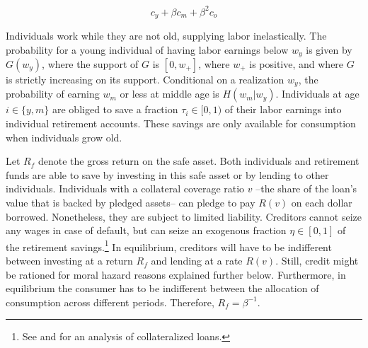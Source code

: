 \documentclass[draft,pdftex,nolinenumbers,noinfoline]{article}
\theoremstyle{plain}
\begin{document}
$$c_y + \beta c_m + \beta^{2}c_o$$ 

Individuals work while they are not old, supplying labor inelastically. The probability for a young individual of having labor earnings below $w_y$ is given by $G(w_y)$, where the support of $G$ is $[0,w_+]$, where $w_+$ is positive, and where $G$ is strictly increasing on its support. Conditional on a realization $w_y$, the probability of earning $w_m$ or less at middle age is $H(w_m|w_y)$. Individuals at age $i\in\{y,m\}$ are obliged to save a fraction $\tau_i\in[0,1)$ of their labor earnings into individual retirement accounts. These savings are only available for consumption when individuals grow old.

Let $R_f$ denote the gross return on the safe asset. Both individuals and retirement funds are able to save by investing in this safe asset or by lending to other individuals. Individuals with a collateral coverage ratio $v$ --the share of the loan's value that is backed by pledged assets-- can pledge to pay $R(v)$ on each dollar borrowed. Nonetheless, they are subject to limited liability. Creditors cannot seize any wages in case of default, but can seize an exogenous fraction $\eta\in[0,1]$ of the retirement savings.\footnote{See \cite{Geanakoplos2010} and \cite{Simsek2013b} for an analysis of collateralized loans.} In equilibrium, creditors will have to be indifferent between investing at a return $R_f$ and lending at a rate $R(v)$. Still, credit might be rationed for moral hazard reasons explained further below. Furthermore, in equilibrium the consumer has to be indifferent between the allocation of consumption across different periods. Therefore, $R_f = \beta^{-1}$.
\end{document}
